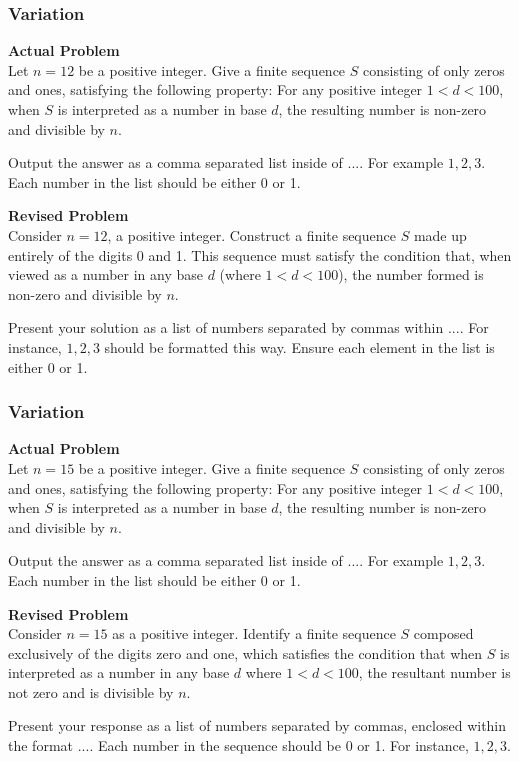 \subsubsection{Variation}
\textbf{Actual Problem}\\
Let $n = 12$ be a positive integer. Give a finite sequence $S$ consisting of only zeros and ones, satisfying the following property: For any positive integer $1 < d < 100$, when $S$ is interpreted as a number in base $d$, the resulting number is non-zero and divisible by $n$.

Output the answer as a comma separated list inside of $\boxed{...}$. For example $\boxed{1, 2, 3}$.
Each number in the list should be either 0 or 1.

\textbf{Revised Problem}\\
Consider $n = 12$, a positive integer. Construct a finite sequence $S$ made up entirely of the digits 0 and 1. This sequence must satisfy the condition that, when viewed as a number in any base $d$ (where $1 < d < 100$), the number formed is non-zero and divisible by $n$.

Present your solution as a list of numbers separated by commas within $\boxed{...}$. For instance, $\boxed{1, 2, 3}$ should be formatted this way. Ensure each element in the list is either 0 or 1.

\subsubsection{Variation}
\textbf{Actual Problem}\\
Let $n = 15$ be a positive integer. Give a finite sequence $S$ consisting of only zeros and ones, satisfying the following property: For any positive integer $1 < d < 100$, when $S$ is interpreted as a number in base $d$, the resulting number is non-zero and divisible by $n$.

Output the answer as a comma separated list inside of $\boxed{...}$. For example $\boxed{1, 2, 3}$.
Each number in the list should be either 0 or 1.

\textbf{Revised Problem}\\
Consider \( n = 15 \) as a positive integer. Identify a finite sequence \( S \) composed exclusively of the digits zero and one, which satisfies the condition that when \( S \) is interpreted as a number in any base \( d \) where \( 1 < d < 100 \), the resultant number is not zero and is divisible by \( n \).

Present your response as a list of numbers separated by commas, enclosed within the format $\boxed{...}$. Each number in the sequence should be 0 or 1. For instance, $\boxed{1, 2, 3}$.

